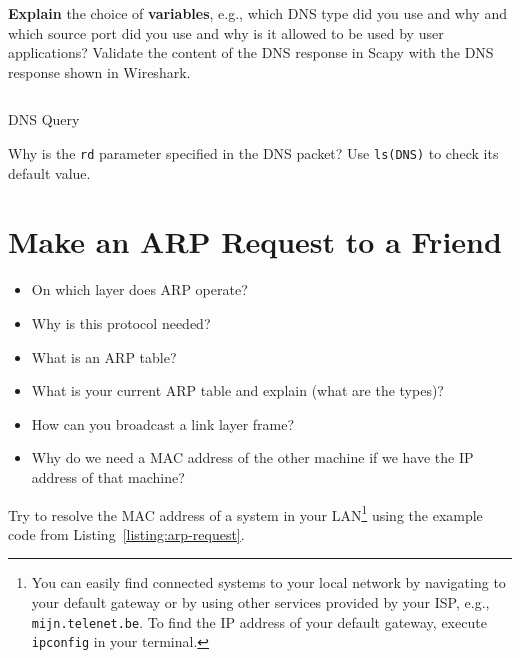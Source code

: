 \documentclass[11pt,a4paper]{article}
\begin{document}
\begin{question}
    \textbf{Explain} the choice of \textbf{variables}, e.g., which DNS type did you use and why and which source port did you use and why is it allowed to be used by user applications?
    Validate the content of the DNS response in Scapy with the DNS response shown in Wireshark.
\end{question}


\begin{listing}[h]
\inputminted[firstline=16]{python}{../code_students/dns_query.py}
\caption{DNS Query}\label{listing:dns-query}
\end{listing}

\begin{question}
    Why is the \texttt{rd} parameter specified in the DNS packet? Use \texttt{ls(DNS)} to check its default value.
\end{question}



\FloatBarrier
\section{Make an ARP Request to a Friend}
\begin{question}
\begin{itemize}
    \item On which layer does ARP operate?
    \item Why is this protocol needed?
    \item What is an ARP table?
    \item What is your current ARP table and explain (what are the types)?
    \item How can you broadcast a link layer frame?
    \item Why do we need a MAC address of the other machine if we have the IP address of that machine?
\end{itemize}
\end{question}

\begin{question}
Try to resolve the MAC address of a system in your LAN\footnote{You can easily find connected systems to your local network by navigating to your default gateway or by using other services provided by your ISP, e.g., \texttt{mijn.telenet.be}. To find the IP address of your default gateway, execute  \texttt{ipconfig} in your terminal.} using the example code from Listing~\ref{listing:arp-request}.
\end{question}
\end{document}
